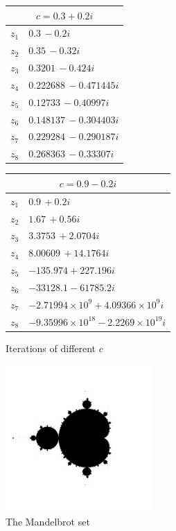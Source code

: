 \documentclass[10pt,a4paper,titlepage]{article}
\begin{document}
	\begin{figure}
		\centering
		\caption{Iterations of different \(c\)}
		\label{fig:iterations_mandelbrot}
		\begin{minipage}{.45\textwidth}
			\centering
			\begin{tabular}{c|l}
				\multicolumn{2}{c}{\(c=0.3+0.2i\)} \\ \hline
				\(z_1\)& \(0.3\, -0.2 i\)\\ \hline
				\(z_2\)& \(0.35\, -0.32 i\)\\ \hline
				\(z_3\)& \(0.3201\, -0.424 i\)\\ \hline
				\(z_4\)& \(0.222688\, -0.471445 i\)\\ \hline
				\(z_5\)& \(0.12733\, -0.40997 i\)\\ \hline
				\(z_6\)& \(0.148137\, -0.304403 i\)\\ \hline
				\(z_7\)& \(0.229284\, -0.290187 i\)\\ \hline
				\(z_8\)& \(0.268363\, -0.33307 i \)\\ \hline
			\end{tabular}
		\end{minipage}
		\begin{minipage}{.45\textwidth}
			\centering
			\begin{tabular}{c|l}
				\multicolumn{2}{c}{\(c=0.9-0.2i\)} \\ \hline
				\(z_1\)& \(0.9\, + 0.2 i\)            \\ \hline
				\(z_2\)& \(1.67\, +0.56 i\)            \\ \hline
				\(z_3\)& \(3.3753\, +2.0704 i\)           \\ \hline
				\(z_4\)& \(8.00609\, +14.1764 i\)            \\ \hline
				\(z_5\)& \(-135.974+227.196 i\)            \\ \hline
				\(z_6\)& \(-33128.1-61785.2 i\) \\ \hline
				\(z_7\)& \(-2.71994\times 10^9+4.09366\times 10^9 i\)           \\ \hline
				\(z_8\)& \(-9.35996\times 10^{18}-2.2269\times 10^{19} i\) \\ \hline
			\end{tabular}
		\end{minipage}
	\end{figure}
	\begin{figure}
		\caption{The Mandelbrot set}
		\label{fig:mandelbrot}
		\centering
		\includegraphics[width=0.5\textwidth]{"res/images/mandelbrot.png"}
	\end{figure}
\end{document}
